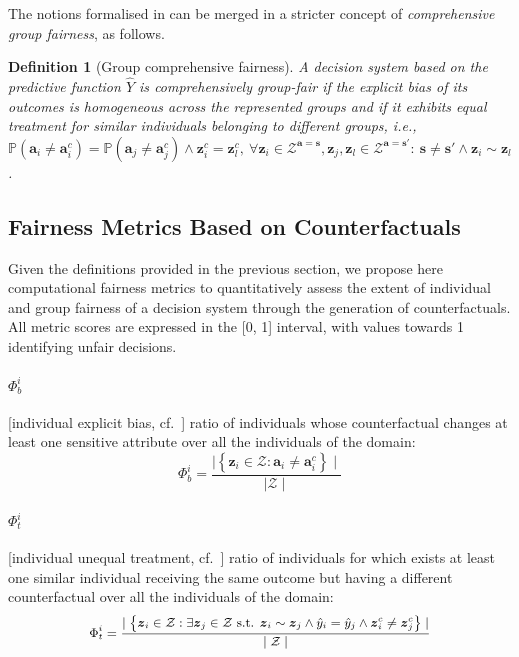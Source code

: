 \documentclass[letterpaper]{article} %
\newtheorem{definition}{Definition}
\begin{document}
The notions formalised in  can be merged in a stricter concept of \emph{comprehensive group fairness}, as follows.
%
\begin{definition}[Group comprehensive fairness]\label{comprehensive_group}
	A decision system based on the predictive function $\hat{Y}$ is \emph{comprehensively group-fair} if the explicit bias of its outcomes is homogeneous across the represented groups and if it exhibits equal treatment for similar individuals belonging to different groups, i.e., $\mathbb{P}(\boldsymbol{a}_{i} \neq \boldsymbol{a}_{i}^{c}) = \mathbb{P}(\boldsymbol{a}_{j} \neq \boldsymbol{a}_{j}^{c}) \wedge \boldsymbol{z}_i^c = \boldsymbol{z}_l^c, ~ \forall \boldsymbol{z}_i \in \mathcal{Z}^{\boldsymbol{a}=\boldsymbol{s}}, \boldsymbol{z}_j, \boldsymbol{z}_l \in \mathcal{Z}^{\boldsymbol{a}=\boldsymbol{s}'} : ~ \boldsymbol{s} \neq \boldsymbol{s}' \wedge \boldsymbol{z}_i \sim \boldsymbol{z}_l$.
\end{definition}

\subsection{Fairness Metrics Based on Counterfactuals}

Given the definitions provided in the previous section, we propose here computational fairness metrics to quantitatively assess the extent of individual and group fairness of a decision system through the generation of counterfactuals.
%
All metric scores are expressed in the [0, 1] interval, with values towards 1 identifying unfair decisions.

\paragraph{$\Phi_b^i$} [individual explicit bias, cf.\ ] ratio of individuals whose counterfactual changes at least one sensitive attribute over all the individuals of the domain:
%
$$\Phi_b^i = \frac{ \mid \left\{ \boldsymbol{z}_i \in \mathcal{Z} : \boldsymbol{a}_{i} \neq \boldsymbol{a}_{i}^{c} \right\} \mid }{\mid \mathcal{Z} \mid} $$

\paragraph{$\Phi_t^i$} [individual unequal treatment, cf.\ ] ratio of individuals for which exists at least one similar individual receiving the same outcome but having a different counterfactual over all the individuals of the domain:
%
$$\small \Phi_t^i = \frac{ \mid \left\{ \boldsymbol{z}_i \in \mathcal{Z} : \exists \boldsymbol{z}_j \in \mathcal{Z} \text{ s.t. } \boldsymbol{z}_i \sim \boldsymbol{z}_j \wedge \hat{y}_i = \hat{y}_j \wedge \boldsymbol{z}_i^c \neq \boldsymbol{z}_j^c \right\} \mid }{\mid \mathcal{Z} \mid} $$
	
\end{document}
